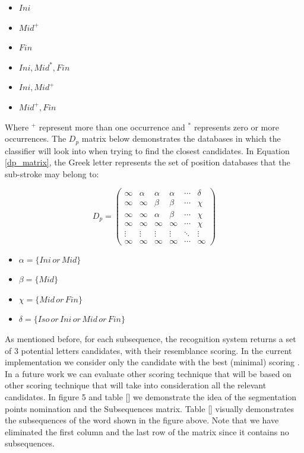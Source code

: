\documentclass[12pt,journal,compsoc]{IEEEtran}
\begin{document}
\begin{multicols}{2}
\begin{itemize}
    \item $Ini$
    \item $Mid^{+}$
    \item $Fin$
    \item $Ini,Mid^{*},Fin$
    \item $Ini,Mid^{+}$
    \item $Mid^{+},Fin$
\end{itemize}
\end{multicols}
Where $^+$ represent more than one occurrence and $^*$ represents zero or more occurrences. The $D_p$ matrix below demonstrates the databases in which the classifier will look into when trying to find the closest candidates. In Equation \ref{dp_matrix}, the Greek letter represents the set of position databases that the sub-stroke may belong to:

\begin{equation}
D_{p}=
\left( \begin{array}{cccccc}
\infty & \alpha & \alpha & \alpha & \cdots & \delta \\
\infty & \infty & \beta & \beta & \cdots & \chi \\
\infty & \infty & \alpha & \beta & \cdots & \chi \\
\infty & \infty & \infty & \infty & \cdots & \chi \\
\vdots & \vdots & \vdots & \vdots & \ddots & \vdots \\
\infty & \infty & \infty & \infty & \cdots & \infty \end{array} \right)
\label{dp_matrix}
\end{equation}

\begin{multicols}{2}
\begin{itemize}
    \item[] $\alpha=\{Ini\,or\,Mid\}$
    \item[] $\beta=\{Mid\}$
    \item[] $\chi=\{Mid\,or\,Fin\}$
    \item[] $\delta=\{Iso\,or\,Ini\,or\,Mid\,or\,Fin\}$
\end{itemize}
\end{multicols}

As mentioned before, for each subsequence, the recognition system returns a set of 3 potential letters candidates, with their resemblance scoring. In the current implementation we consider only the candidate with the best (minimal) scoring . In a future work we can evaluate other scoring technique that will be based on other scoring technique that will take into consideration all the relevant candidates.
In figure 5 and table [] we demonstrate the idea of the segmentation points nomination and the Subsequences matrix.
Table [] visually demonstrates the subsequences of the word shown in the figure above. Note that we have eliminated the first column and the last row of the matrix since it contains no subsequences.
\end{document}
